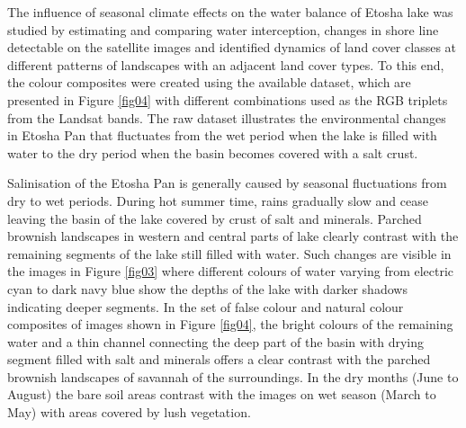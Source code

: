 \documentclass[climate,article,submit,pdftex,moreauthors]{Definitions/mdpi}
\begin{document}
{The influence of seasonal climate effects on the water balance of Etosha lake was studied by estimating and comparing water interception, changes in shore line detectable on the satellite images and identified dynamics of land cover classes at different patterns of landscapes with an adjacent land cover types. To this end, }the colour composites {were created using the available dataset, which are} presented in Figure \ref{fig04} with different combinations used as the RGB triplets from the Landsat bands. The raw dataset illustrates the environmental changes in Etosha Pan that fluctuates from the wet period when the lake is filled with water to the dry period when the basin becomes covered with a salt crust. 

{Salinisation of the Etosha Pan is generally caused by seasonal fluctuations from dry to wet periods. During hot summer time, rains gradually slow and cease leaving the basin of the lake covered by crust of salt and minerals}. Parched brownish landscapes in western and central parts of lake clearly contrast with the remaining segments of the lake still filled with water. Such changes are visible in the images in Figure \ref{fig03} where different colours of water varying from electric cyan to dark navy blue show the depths of the lake with darker shadows indicating deeper segments. In the set of false colour and natural colour composites of images shown in Figure \ref{fig04}, the bright colours of the remaining water and a thin channel connecting the deep part of the basin with drying segment filled with salt and minerals offers a clear contrast with the parched brownish landscapes of savannah of the surroundings. In the dry months (June to August) the bare soil areas contrast with the images on wet season (March to May) with areas covered by lush vegetation. 
\end{document}
